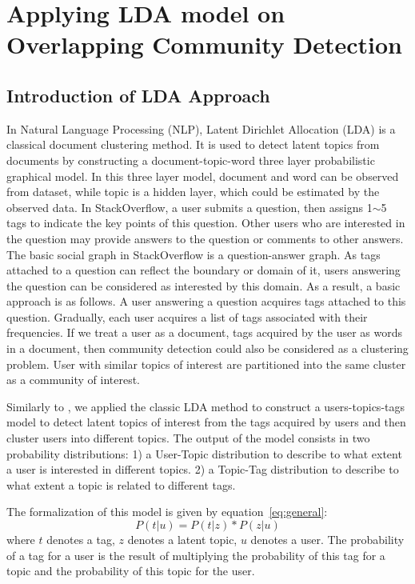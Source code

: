 \chapter{Applying LDA model on Overlapping Community Detection}
\doublespacing
\label{chap:lda}
\minitoc

\section{Introduction of LDA Approach}
In Natural Language Processing (NLP), Latent Dirichlet Allocation (LDA) \cite{blei2003latent} is a classical document clustering method. It is used to detect latent topics from documents by constructing a document-topic-word three layer probabilistic graphical model. In this three layer model, document and word can be observed from dataset, while topic is a hidden layer, which could be estimated by the observed data.  
In StackOverflow, a user submits a question, then assigns 1$\sim$5 tags to indicate the key points of this question. Other users who are interested in the question may provide answers to the question or comments to other answers. The basic social graph in StackOverflow is a question-answer graph. As tags attached to a question can reflect the boundary or domain of it, users answering the question can be considered as interested by this domain. As a result, a basic approach is as follows. A user answering a question acquires tags attached to this question. Gradually, each user acquires a list of tags associated with their frequencies. If we treat a user as a document, tags acquired by the user as words in a document, 
then community detection could also be considered as a clustering problem. User with similar topics of interest are partitioned into the same cluster as a community of interest.

Similarly to \cite{Li:2010:CTM:1871437.1871673}, we applied the classic LDA method to construct a users-topics-tags model to detect latent topics of interest from the tags acquired by users and then cluster users into different topics. The output of the model consists in two probability distributions:
1) a User-Topic distribution to describe to what extent a user is interested in different topics.
2) a Topic-Tag distribution to describe to what extent a topic is related to different tags.


The formalization of this model is given by equation~\ref{eq:general}: 
\begin{equation}
P(t|u)=P(t|z)*P(z|u)
\label{eq:general}
\end{equation}
where $t$ denotes a tag, $z$ denotes a latent topic, $u$ denotes a user. The probability of a tag for a user is the result of multiplying the probability of this tag for a topic and the probability of this topic for the user.

